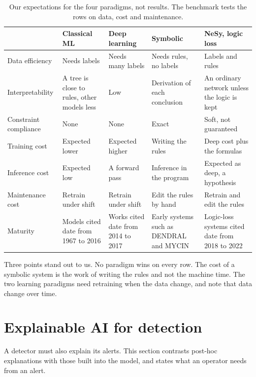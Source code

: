\begin{table}[htbp]
\centering
\footnotesize
\setlength{\tabcolsep}{3pt}
\caption{Our expectations for the four paradigms, not results. The benchmark
tests the rows on data, cost and maintenance.}
\label{tab:paradigm-comparison}
\begin{tabular}{@{}p{2.4cm}p{2.5cm}p{2.5cm}p{2.5cm}p{2.5cm}@{}}
\toprule
 & Classical ML & Deep learning & Symbolic & NeSy, logic loss \\
\midrule
Data efficiency & Needs labels & Needs many labels & Needs rules, no labels & Labels and rules \\
Interpretability & A tree is close to rules, other models less & Low
  & Derivation of each conclusion & An ordinary network unless the logic is kept \\
Constraint compliance & None & None & Exact & Soft, not guaranteed \\
Training cost & Expected lower & Expected higher & Writing the rules & Deep cost plus the formulas \\
Inference cost & Expected low & A forward pass & Inference in the program & Expected as deep, a hypothesis \\
Maintenance cost & Retrain under shift & Retrain under shift & Edit the rules by hand & Retrain and edit the rules \\
Maturity & Models cited date from 1967 to 2016 & Works cited date from 2014 to 2017
  & Early systems such as DENDRAL and MYCIN & Logic-loss systems cited date from 2018 to 2022 \\
\bottomrule
\end{tabular}
\end{table}

Three points stand out to us. No paradigm wins on every row. The cost of a
symbolic system is the work of writing the rules and not the machine time.
The two learning paradigms need retraining when the data change, and
\citet{arp2022dosdonts} note that data change over time.

\section{Explainable AI for detection}
\label{sec:xai}

A detector must also explain its alerts. This section contrasts post-hoc explanations with
those built into the model, and states what an operator needs from an alert.

